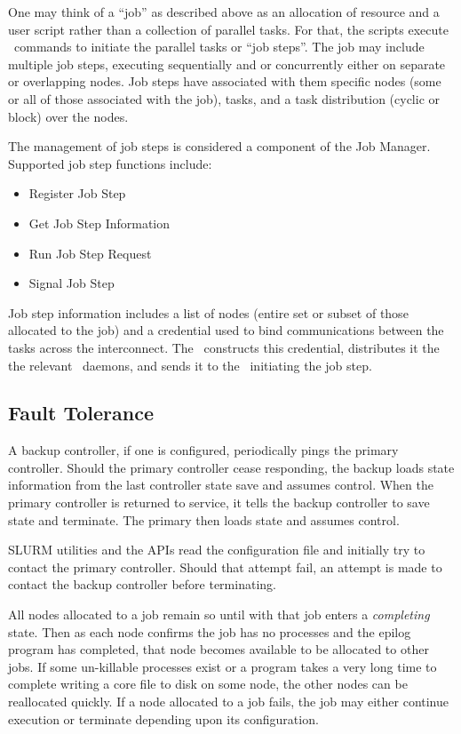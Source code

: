One may think of a ``job'' as described above as an allocation of resource 
and a user script rather than a collection of parallel tasks. For that, 
the scripts execute \srun\ commands to initiate the parallel tasks 
or ``job steps''. The job may include multiple job steps, executing 
sequentially and or concurrently either on separate or overlapping nodes. 
Job steps have associated with them specific nodes (some or all of those 
associated with the job), tasks, and a task distribution (cyclic or 
block) over the nodes. 

The management of job steps is considered a component of the Job 
Manager.
Supported job step functions include:
\begin{itemize}
\item Register Job Step
\item Get Job Step Information
\item Run Job Step Request
\item Signal Job Step
\end{itemize}
Job step information includes a list of 
nodes (entire set or subset of those allocated to the job) and a 
credential used to bind communications between the tasks across 
the interconnect. The \slurmctld\ constructs this credential, 
distributes it the the relevant \slurmd\ daemons, and sends it to 
the \srun\ initiating the job step.

\subsection{Fault Tolerance}

A backup controller, if one is configured, periodically pings
the primary controller.  Should the primary controller cease
responding, the backup loads state information from the last 
controller state save and assumes control.  
When the primary controller is returned to service, it tells the 
backup controller to save state and terminate.  
The primary then loads state and assumes control.

SLURM utilities and the APIs read the configuration file 
and initially try to contact the primary controller. 
Should that attempt fail, an attempt is made to contact the 
backup controller before terminating.

All nodes allocated to a job remain so until with that job enters a 
{\em completing} state. 
Then as each node confirms the job has no processes and the epilog 
program has completed, that node becomes available to be allocated 
to other jobs. 
If some un-killable processes exist or a program takes a very long 
time to complete writing a core file to disk on some node, the other 
nodes can be reallocated quickly.
If a node allocated to a job fails, the job may either continue 
execution or terminate depending upon its configuration.

